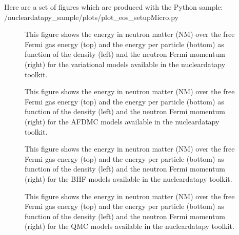 \documentclass[letterpaper,10pt,english]{sphinxmanual}
\begin{document}
\sphinxAtStartPar
Here are a set of figures which are produced with the Python sample: /nucleardatapy\_sample/plots/plot\_eos\_setupMicro.py

\begin{figure}[htbp]
\centering
\capstart

\noindent{}
\caption{This figure shows the energy in neutron matter (NM) over the free Fermi gas energy (top) and the energy per particle (bottom) as function of the density (left) and the neutron Fermi momentum (right) for the variational models available in the nucleardatapy toolkit.}\label{\detokenize{source/api/setup_eos_micro:id1}}\end{figure}

\begin{figure}[htbp]
\centering
\capstart

\noindent{}
\caption{This figure shows the energy in neutron matter (NM) over the free Fermi gas energy (top) and the energy per particle (bottom) as function of the density (left) and the neutron Fermi momentum (right) for the AFDMC models available in the nucleardatapy toolkit.}\label{\detokenize{source/api/setup_eos_micro:id2}}\end{figure}

\begin{figure}[htbp]
\centering
\capstart

\noindent{}
\caption{This figure shows the energy in neutron matter (NM) over the free Fermi gas energy (top) and the energy per particle (bottom) as function of the density (left) and the neutron Fermi momentum (right) for the BHF models available in the nucleardatapy toolkit.}\label{\detokenize{source/api/setup_eos_micro:id3}}\end{figure}

\begin{figure}[htbp]
\centering
\capstart

\noindent{}
\caption{This figure shows the energy in neutron matter (NM) over the free Fermi gas energy (top) and the energy per particle (bottom) as function of the density (left) and the neutron Fermi momentum (right) for the QMC models available in the nucleardatapy toolkit.}\label{\detokenize{source/api/setup_eos_micro:id4}}\end{figure}
\end{document}
